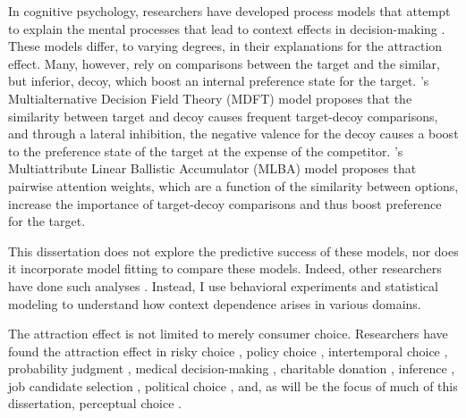 In cognitive psychology, researchers have developed process models that attempt to explain the mental processes that lead to context effects in decision-making \parencite{trueblood2014multiattribute,roeMultialternativeDecisionField2001a,usherLossAversionInhibition2004a,bhatiaAssociationsAccumulationPreference2013b,noguchiMultialternativeDecisionSampling2018a,wollschlager2NaryChoiceTree2012a,bergnerVAMPVotingAgent2019b,tverskyEliminationAspectsTheory1972,tversky1993context}. These models differ, to varying degrees, in their explanations for the attraction effect. Many, however, rely on comparisons between the target and the similar, but inferior, decoy, which boost an internal  preference state for the target. \textcite{roeMultialternativeDecisionField2001a}'s Multialternative Decision Field Theory (MDFT) model proposes that the similarity between target and decoy causes frequent target-decoy comparisons, and through a lateral inhibition, the negative valence for the decoy causes a boost to the preference state of the target at the expense of the competitor. \textcite{trueblood2014multiattribute}'s Multiattribute Linear Ballistic Accumulator (MLBA) model proposes that pairwise attention weights, which are a function of the similarity between options, increase the importance of target-decoy comparisons and thus boost preference for the target. 

This dissertation does not explore the predictive success of these models, nor does it incorporate model fitting to compare these models. Indeed, other researchers have done such analyses \parencite{turnerCompetingTheoriesMultialternative2018a,cataldoModelingPreferenceReversals2021,evansResponsetimeDataProvide2019b,molloyWhatResponseTime2019a,berkowitschRigorouslyTestingMultialternative2014b,hotalingTheoreticalDevelopmentsDecision2010,cohen2017multi}. Instead, I use behavioral experiments and statistical modeling to understand how context dependence arises in various domains.

The attraction effect is not limited to merely consumer choice. Researchers have found the attraction effect in risky choice \parencite{mohr2017attraction}, policy choice \parencite{herneDecoyAlternativesPolicy1997b}, intertemporal choice \parencite{mariniAttractionComesMany2020}, probability judgment \parencite{caiWhenAlternativeHypotheses2023}, medical decision-making \parencite{schwartz1999more}, charitable donation \parencite{pittarello2020three},  inference \parencite{truebloodMultialternativeContextEffects2012}, job candidate selection \parencite{highhouseContextDependentSelectionEffects1996}, political choice \parencite{pan1995attractiovoting}, and, as will be the focus of much of this dissertation, perceptual choice \parencite{evansImpactPresentationOrder2021,trueblood2013not,spektorRepulsionEffectPreferential2022,spektorWhenGoodLooks2018b,yearsleyContextEffectsSimilarity2022,turnerCompetingTheoriesMultialternative2018a,liaoInfluenceDistanceDecoy2021}. 

